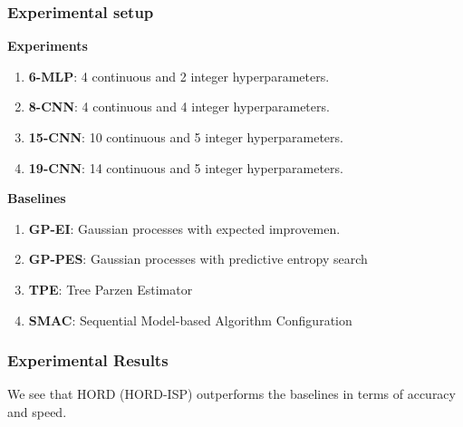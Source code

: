 \documentclass{beamer}
\begin{document}
\begin{frame}
  \frametitle{Experimental setup}
  \textbf{Experiments}
  \begin{enumerate}
    \item \textbf{6-MLP}: 4 continuous and 2 integer hyperparameters.
    \item \textbf{8-CNN}: 4 continuous and 4 integer hyperparameters.
    \item \textbf{15-CNN}: 10 continuous and 5 integer hyperparameters.
    \item \textbf{19-CNN}: 14 continuous and 5 integer hyperparameters.
  \end{enumerate}
  \textbf{Baselines}
  \begin{enumerate}
    \item \textbf{GP-EI}: Gaussian processes with expected improvemen.
    \item \textbf{GP-PES}: Gaussian processes with predictive entropy search
    \item \textbf{TPE}: Tree Parzen Estimator
    \item \textbf{SMAC}: Sequential Model-based Algorithm Configuration
  \end{enumerate}
\end{frame}


\begin{frame}
  \frametitle{Experimental Results}
  \begin{figure}
    \hfill
    \hfill
    \hfill
    \end{figure}
    We see that HORD (HORD-ISP) outperforms the baselines in terms of accuracy and speed.
\end{frame}
\end{document}
